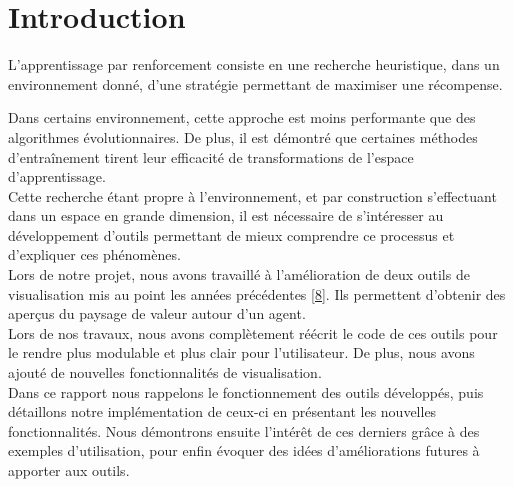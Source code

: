 \documentclass[12pt]{article}
\begin{document}
\newpage																		

\setlength{\parindent}{2ex}

\section*{Introduction}

L’apprentissage par renforcement consiste en une recherche heuristique, dans un environnement donné, d’une stratégie permettant de maximiser une récompense. \par

Dans certains environnement, cette approche est moins performante que des algorithmes évolutionnaires. De plus, il est démontré que certaines méthodes d’entraînement tirent leur efficacité de transformations de l’espace d’apprentissage. \\

Cette recherche étant propre à l’environnement, et par construction s’effectuant dans un espace en grande dimension, il est nécessaire de s’intéresser au développement d’outils permettant de mieux comprendre ce processus et d’expliquer ces phénomènes. \\

Lors de notre projet, nous avons travaillé à l’amélioration de deux outils de visualisation mis au point les années précédentes \href{https://github.com/DevMaelFranceschetti/PAnd_Swimmer/blob/master/paper_study_Swimmer.pdf}{[8]}. Ils permettent d’obtenir des aperçus du paysage de valeur autour d’un agent. \\

Lors de nos travaux, nous avons complètement réécrit le code de ces outils pour le rendre plus modulable et plus clair pour l’utilisateur. De plus, nous avons ajouté de nouvelles fonctionnalités de visualisation. \\

Dans ce rapport nous rappelons le fonctionnement des outils développés, puis détaillons notre implémentation de ceux-ci en présentant les nouvelles fonctionnalités. Nous démontrons ensuite l'intérêt de ces derniers grâce à des exemples d'utilisation, pour enfin évoquer des idées d'améliorations futures à apporter aux outils. \\

\newpage

\renewcommand*\contentsname{Table des Matières}
\tableofcontents 
\end{document}
